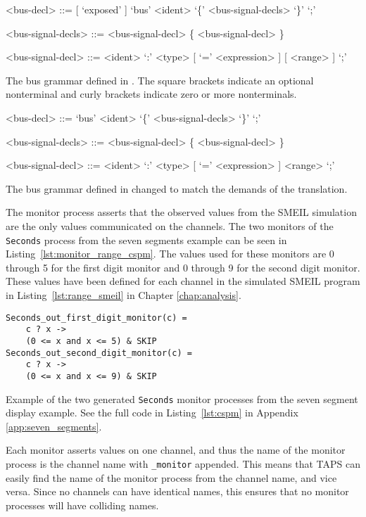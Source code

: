 \begin{listing}
    \begin{grammar}
    <bus-decl> ::= [ `exposed' ] `bus' <ident> `\{' <bus-signal-decls> `\}'  `;'

    <bus-signal-decls> ::= <bus-signal-decl> \{ <bus-signal-decl> \}

    <bus-signal-decl> ::= <ident> `:' <type> [ `=' <expression> ] [ <range> ] `;'
    \end{grammar}
    \caption{The bus grammar defined in \cite{Asheim2018}. The square brackets indicate an optional nonterminal and curly brackets indicate zero or more nonterminals.}
    \label{lst:smeil_bus_grammar}
\end{listing}
\begin{listing}
    \begin{grammar}
    <bus-decl> ::= `bus' <ident> `\{' <bus-signal-decls> `\}'  `;'

    <bus-signal-decls> ::= <bus-signal-decl> \{ <bus-signal-decl> \}

    <bus-signal-decl> ::= <ident> `:' <type> [ `=' <expression> ] <range> `;'
    \end{grammar}
    \caption{The bus grammar defined in \cite{Asheim2018} changed to match the demands of the translation.}
    \label{lst:smeil_bus_grammar_no_option}
\end{listing}
The monitor process asserts that the observed values from the SMEIL simulation are the only values communicated on the channels. The two monitors of the \texttt{Seconds} process from the seven segments example can be seen in Listing~\ref{lst:monitor_range_cspm}. The values used for these monitors are 0 through 5 for the first digit monitor and 0 through 9 for the second digit monitor. These values have been defined for each channel in the simulated SMEIL program in Listing~\ref{lst:range_smeil} in Chapter \ref{chap:analysis}.
\begin{listing}
\begin{verbatim}
Seconds_out_first_digit_monitor(c) =
    c ? x ->
    (0 <= x and x <= 5) & SKIP
Seconds_out_second_digit_monitor(c) =
    c ? x ->
    (0 <= x and x <= 9) & SKIP
\end{verbatim}
\caption{Example of the two generated \texttt{Seconds} monitor processes from the seven segment display example. See the full code in Listing~\ref{lst:cspm} in Appendix \ref{app:seven_segments}.}
\label{lst:monitor_range_cspm}
\end{listing}
Each monitor asserts values on one channel, and thus the name of the monitor process is the channel name with \texttt{\_monitor} appended. This means that TAPS can easily find the name of the monitor process from the channel name, and vice versa.
Since no \cspm{} channels can have identical names, this ensures that no monitor processes will have colliding names.\\

